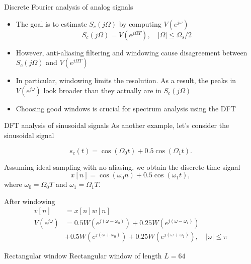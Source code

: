 \documentclass[10pt, aspectratio=169, handout]{beamer}
\begin{document}
\begin{frame}{Discrete Fourier analysis of analog signals}
	\begin{itemize}
		\item The goal is to estimate $S_c(j\Omega)$ by computing $V(e^{j\omega})$ 
		\begin{equation*}
			S_c(j\Omega) = V(e^{j\Omega T}), \quad |\Omega| \leq \Omega_s/2  \tag{ideally}
		\end{equation*}
		\item However, anti-aliasing filtering and windowing cause disagreement between $S_c(j\Omega)$ and $V(e^{j\Omega T})$
		\item In particular, windowing limits the resolution. As a result, the peaks in $V(e^{j\omega})$ look broader than they actually are in $S_c(j\Omega)$
		\item Choosing good windows is crucial for spectrum analysis using the DFT
	\end{itemize}
\end{frame}



\begin{frame}{DFT analysis of sinusoidal signals}
As another example, let's consider the sinusoidal signal

\begin{equation*}
	s_c(t) = \cos(\Omega_0t) + 0.5\cos(\Omega_1t).
\end{equation*}

Assuming ideal sampling with no aliasing, we obtain the discrete-time signal
\begin{equation*}
 	x[n] = \cos(\omega_0n) + 0.5\cos(\omega_1t),
\end{equation*}
where $\omega_0 = \Omega_0 T$ and $\omega_1 = \Omega_1 T$.

After windowing
\begin{align*}
	v[n] &= x[n]w[n] \\
	V(e^{j\omega}) &= 0.5W(e^{j(\omega-\omega_0)}) + 0.25W(e^{j(\omega-\omega_1)}) \\
	& + 0.5W(e^{j(\omega+\omega_0)}) + 0.25W(e^{j(\omega+\omega_1)}), \quad |\omega|\leq\pi
\end{align*}
\end{frame}

%
\begin{frame}{Rectangular window}
Rectangular window of length $L = 64$

\begin{center}
	\resizebox{0.9\textwidth}{!}{}
\end{center}

\end{frame}
\end{document}
